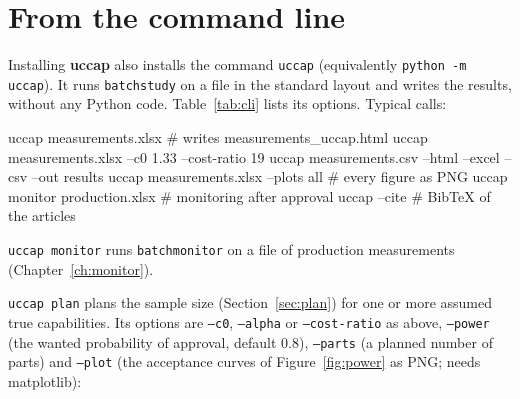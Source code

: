 \documentclass[a4paper,11pt,oneside,openany,parskip=half-,headings=standardclasses,toc=flat,numbers=noenddot]{scrbook}
\newcommand{\code}[1]{\texttt{\begingroup\def\_{\textunderscore\allowbreak}#1\endgroup}}
\newcommand{\pkg}{\textsf{\bfseries uccap}}
\newcommand{\secref}[1]{Section~\ref{#1}}
\newcommand{\chapref}[1]{Chapter~\ref{#1}}
\newcommand{\figref}[1]{Figure~\ref{#1}}
\newcommand{\tabref}[1]{Table~\ref{#1}}
\begin{document}
\section{From the command line}\label{sec:cli}
Installing \pkg{} also installs the command \code{uccap} (equivalently \code{python -m uccap}). It runs
\code{batch\_study} on a file in the standard layout and writes the results, without any Python code.
\tabref{tab:cli} lists its options. Typical calls:

\begin{shcode}
uccap measurements.xlsx                          # writes measurements_uccap.html
uccap measurements.xlsx --c0 1.33 --cost-ratio 19
uccap measurements.csv --html --excel --csv --out results
uccap measurements.xlsx --plots all              # every figure as PNG
uccap monitor production.xlsx                    # monitoring after approval
uccap --cite                                     # BibTeX of the articles
\end{shcode}

\code{uccap monitor} runs \code{batch\_monitor} on a file of production measurements (\chapref{ch:monitor}).

\code{uccap plan} plans the sample size (\secref{sec:plan}) for one or more assumed true capabilities. Its
options are \code{--c0}, \code{--alpha} or \code{--cost-ratio} as above, \code{--power} (the wanted probability
of approval, default 0.8), \code{--parts} (a planned number of parts) and \code{--plot} (the acceptance curves
of \figref{fig:power} as PNG; needs matplotlib):

\end{document}
